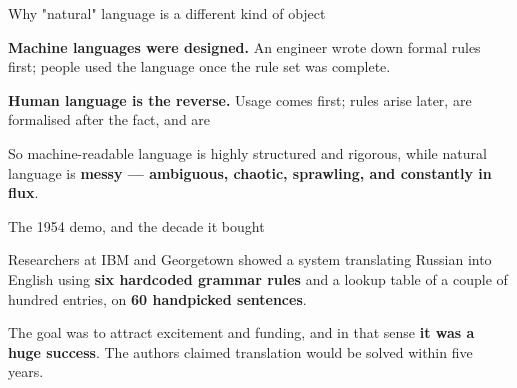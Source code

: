 \documentclass[aspectratio=169,11pt,t]{beamer}
\begin{document}
\begin{frame}[shrink=25]{Why "natural" language is a different kind of object}
\begin{minipage}[t]{0.485\textwidth}
{\fontsize{9.4}{12.6}\selectfont\color{fg2}\textbf{Machine languages were designed.} An engineer wrote down formal rules first; people used the language once the rule set was complete.\par}\vskip 4pt

\end{minipage}%
\hfill
\begin{minipage}[t]{0.485\textwidth}
{\fontsize{9.4}{12.6}\selectfont\color{fg2}\textbf{Human language is the reverse.} Usage comes first; rules arise later, are formalised after the fact, and are \par}\vskip 4pt

\end{minipage}%
\begin{iband}[signal]
So machine-readable language is highly structured and rigorous, while natural language is \textbf{messy --- ambiguous, chaotic, sprawling, and constantly in flux}.
\end{iband}
\end{frame}

\begin{frame}[shrink=25]{The 1954 demo, and the decade it bought}
{\fontsize{9.4}{12.6}\selectfont\color{fg2}Researchers at IBM and Georgetown showed a system translating Russian into English using \textbf{six hardcoded grammar rules} and a lookup table of a couple of hundred entries, on \textbf{60 handpicked sentences}.\par}\vskip 4pt
\begin{iband}[amber]
The goal was to attract excitement and funding, and in that sense \textbf{it was a huge success}. The authors claimed translation would be solved within five years. 
\end{iband}
\end{frame}
\end{document}
